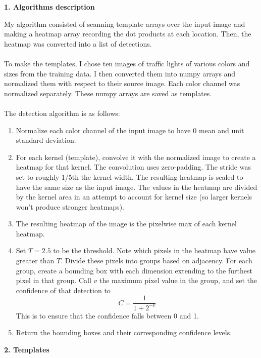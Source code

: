 \documentclass[12pt,letterpaper]{article} \usepackage{fullpage}
\begin{document}

\textbf{1. Algorithms description}

My algorithm consisted of scanning template arrays over the input image and
making a heatmap array recording the dot products at each location. Then, the
heatmap was converted into a list of detections.\\\\
To make the templates, I chose ten images of traffic lights of various colors and
sizes from the training data. I then converted them into numpy arrays and
normalized them with respect to their source image. Each color channel was
normalized separately. These numpy arrays are saved as templates. \\\\
The detection algorithm is as follows:

\begin{enumerate}
    \item Normalize each color channel of the input image to have 0 mean and
    unit standard deviation.
    \item For each kernel (template), convolve it with the normalized image to create
    a heatmap for that kernel.
    The convolution uses zero-padding.
    The stride was set to roughly 1/5th the kernel
    width. The resulting heatmap is scaled to have the same size as the input image.
    The values in the heatmap are divided by the kernel area in an attempt to
    account for kernel size (so larger kernels won't produce stronger heatmaps).
    \item The resulting heatmap of the image is the pixelwise max of each kernel
    heatmap.
    \item Set $T = 2.5$ to be the threshold. Note which pixels in the heatmap
    have value greater than $T$. Divide these pixels into groups based on adjacency.
    For each group, create a bounding box with each dimension extending
    to the furthest pixel in that group. Call $v$ the maximum pixel value in the group,
    and set the confidence of that detection to \[C = \frac{1}{1+2^{-v}}\]
    This is to ensure that the confidence falls between 0 and 1.
    \item Return the bounding boxes and their corresponding confidence levels.
\end{enumerate}


\textbf{2. Templates}
\end{document}
